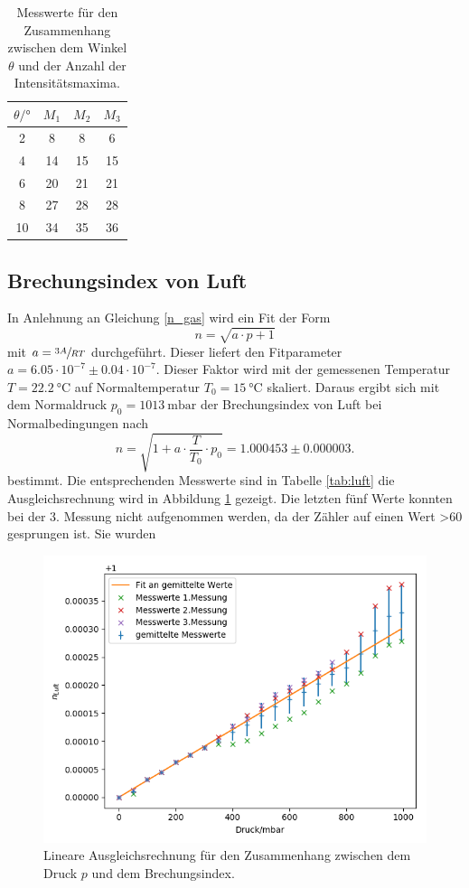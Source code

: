 \begin{table}
  \caption{Messwerte für den Zusammenhang zwischen dem Winkel $\theta$ und der Anzahl
  der Intensitätsmaxima.}
  \label{tab:glas}
  \centering
  \begin{tabular}{c|c|c|c}
    $\theta/°$ & $M_1$ & $M_2$ & $M_3$ \\ \midrule
    2 & 8 & 8 & 6 \\
    4 & 14  & 15  & 15 \\
    6 & 20  & 21  & 21 \\
    8 & 27  & 28  & 28 \\
    10 & 34 & 35  & 36
  \end{tabular}
\end{table}

\subsection{Brechungsindex von Luft}

In Anlehnung an Gleichung \ref{n_gas} wird ein Fit der Form
\[
n = \sqrt{a \cdot p + 1}
\]
mit $a = \sfrac{3A}{RT}$ durchgeführt. Dieser liefert den Fitparameter
$a = 6.05 \cdot 10^{-7} \pm 0.04 \cdot 10^{-7}$. Dieser Faktor wird mit der gemessenen Temperatur
$T = \SI{22.2}{\degreeCelsius}$ auf Normaltemperatur $T_0 = \SI{15}{\degreeCelsius}$ skaliert.
Daraus ergibt sich mit dem Normaldruck $p_0 = \SI{1013}{\milli\bar}$ der Brechungsindex von Luft bei
Normalbedingungen nach
\[
n = \sqrt{1 + a \cdot \frac{T}{T_0} \cdot p_0} = 1.000453 \pm 0.000003.
\]
bestimmt. Die entsprechenden Messwerte sind in Tabelle \ref{tab:luft} die Ausgleichsrechnung wird
in Abbildung \ref{n_luft} gezeigt. Die letzten fünf Werte konnten bei der 3. Messung nicht aufgenommen
werden, da der Zähler auf einen Wert >60 gesprungen ist. Sie wurden

\begin{figure}[h]
\centering
\includegraphics[width=\linewidth]{img/n_luft.png}
\caption{Lineare Ausgleichsrechnung für den Zusammenhang zwischen dem Druck $p$ und dem Brechungsindex.}
\label{n_luft}
\end{figure}


